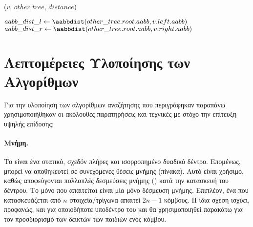 \IncMargin{1.5em}
\begin{algorithm}[h]
    \caption[Απόσταση Τριγωνικών Πλεγμάτων με Δύο  Αναδρομή]{
        }
    \label{alg:search_on_two_trees_recursive}
    \DontPrintSemicolon
    
    \Indm\nonl\searchtwotrees($v$, $other\_tree$, $distance$)\\
    \Indp

    $aabb\_dist\_l \gets \aabbdist(other\_tree.root.aabb, v.left.aabb)$\;
    $aabb\_dist\_r \gets \aabbdist(other\_tree.root.aabb, v.right.aabb)$\;
    \Return{}
\end{algorithm}
\DecMargin{1.5em}

\section{Λεπτομέρειες Υλοποίησης των Αλγορίθμων}
Για την υλοποίηση των αλγορίθμων αναζήτησης που περιγράφηκαν 
παραπάνω χρησιμοποιήθηκαν οι ακόλουθες παρατηρήσεις και τεχνικές
με στόχο την επίτευξη υψηλής επίδοσης:

\paragraph{Μνήμη.} 
Το  είναι ένα στατικό, σχεδόν πλήρες 
και ισορροπημένο δυαδικό δέντρο. 
Επομένως, μπορεί να αποθηκευτεί σε συνεχόμενες θέσεις μνήμης 
(πίνακα). 
Αυτό είναι χρήσιμο, καθώς αποφεύγονται πολλαπλές δεσμεύσεις 
μνήμης () κατά την κατασκευή του δέντρου. 
Το μόνο που απαιτείται είναι μία μόνο δέσμευση μνήμης.
Επιπλέον, ένα  που κατασκευάζεται από $n$ 
στοιχεία/τρίγωνα απαιτεί $2n - 1$ κόμβους. 
Η ίδια σχέση ισχύει, προφανώς, και για οποιοδήποτε 
υποδέντρο του  και θα χρησιμοποιηθεί παρακάτω
για τον προσδιορισμό των δεικτών των παιδιών ενός κόμβου.


